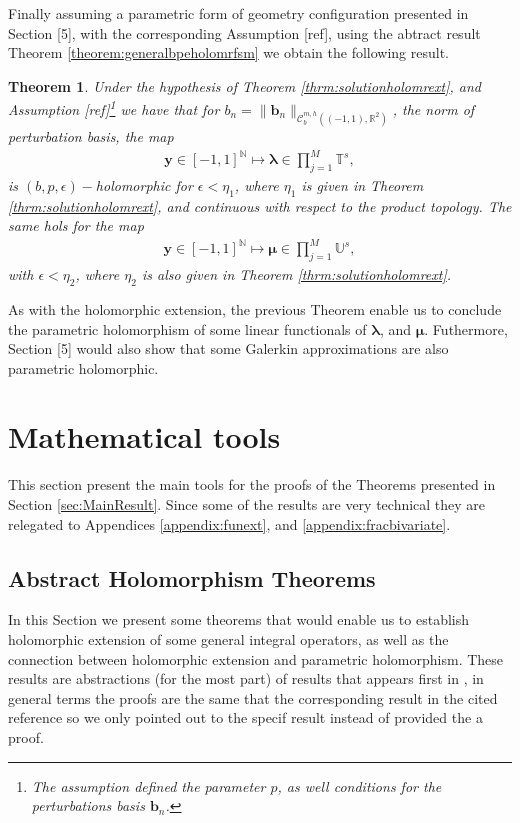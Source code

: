 \documentclass{article}
\newtheorem{theorem}{Theorem}[section]
\newcommand{\todo}[1]{{\color{red}[#1]}}
\newcommand{\bmu} {\bm{\mu}}
\newcommand{\IN}{{\mathbb N}}
\newcommand{\IR}{{\mathbb R}}
\newcommand{\IU}{{\mathbb U}}
\newcommand{\IT}{{\mathbb T}}
\newcommand{\rgeoh}[2]{\mathcal{C}_b^{#1,#2}\left( (-1,1), \IR^2 \right)}
\newcommand{\bla}{\boldsymbol \lambda}
\newcommand{\by}{\bm{y}}
\begin{document}
Finally assuming a parametric form of geometry configuration presented in Section \todo{5}, with the corresponding Assumption \todo{ref}, using the abtract result Theorem \ref{theorem:generalbpeholomrfsm} we obtain the following result. 

\begin{theorem}
\label{thrm:bpeholomr}
Under the hypothesis of Theorem \ref{thrm:solutionholomrext}, and Assumption \todo{ref}\footnote{The assumption defined the parameter $p$, as well conditions for the perturbations basis $\mathbf{b}_n$.} we have that for $b_n = \|\mathbf{b}_n\|_{\rgeoh{m}{h}}$, the norm of perturbation basis, the map
\begin{align*}
\by \in [-1,1]^{\IN} \mapsto \bla \in \prod_{j=1}^M \IT^s,
\end{align*}
is $(b,p,\epsilon)-$holomorphic for $\epsilon < \eta_1$, where $\eta_1$ is given in Theorem \ref{thrm:solutionholomrext}, and continuous with respect to the product topology. The same hols for the map 
\begin{align*}
\by \in [-1,1]^{\IN} \mapsto \bmu \in \prod_{j=1}^M \IU^s,
\end{align*}
with $\epsilon < \eta_2$, where $\eta_2$ is also given in Theorem \ref{thrm:solutionholomrext}.
\end{theorem}
As with the holomorphic extension, the previous Theorem enable us to conclude the parametric holomorphism of some linear functionals of $\bla$, and $\bmu$. Futhermore, Section \todo{5} would also show that some Galerkin approximations are also parametric holomorphic. 
\section{Mathematical tools}
This section present the main tools for the proofs of the Theorems presented in Section \ref{sec:MainResult}. Since some of the results are very technical they are relegated to Appendices \ref{appendix:funext}, and \ref{appendix:fracbivariate}.

\subsection{Abstract Holomorphism Theorems}

In this Section we present some theorems that would enable us to establish holomorphic extension of some general integral operators, as well as the connection between holomorphic extension and parametric holomorphism. These results are abstractions (for the most part) of results that appears first in \cite{Henriquez2021}, in general terms the proofs are the same that the corresponding result in the cited reference so we only pointed out to the specif result instead of provided the a proof. 
\end{document}

